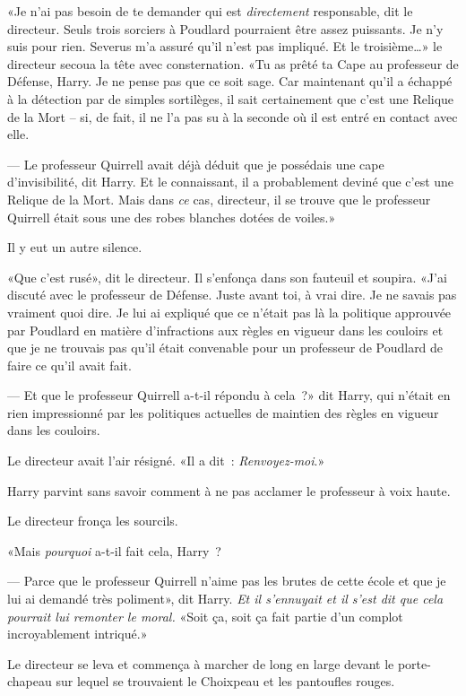 «Je n'ai pas besoin de te demander qui est \emph{directement} responsable, dit le directeur. Seuls trois sorciers à Poudlard pourraient être assez puissants. Je n'y suis pour rien. Severus m'a assuré qu'il n'est pas impliqué. Et le troisième…» le directeur secoua la tête avec consternation. «Tu as prêté ta Cape au professeur de Défense, Harry. Je ne pense pas que ce soit sage. Car maintenant qu'il a échappé à la détection par de simples sortilèges, il sait certainement que c'est une Relique de la Mort -- si, de fait, il ne l'a pas su à la seconde où il est entré en contact avec elle.

--- Le professeur Quirrell avait déjà déduit que je possédais une cape d'invisibilité, dit Harry. Et le connaissant, il a probablement deviné que c'est une Relique de la Mort. Mais dans \emph{ce} cas, directeur, il se trouve que le professeur Quirrell était sous une des robes blanches dotées de voiles.»

Il y eut un autre silence.

«Que c'est rusé», dit le directeur. Il s'enfonça dans son fauteuil et soupira. «J'ai discuté avec le professeur de Défense. Juste avant toi, à vrai dire. Je ne savais pas vraiment quoi dire. Je lui ai expliqué que ce n'était pas là la politique approuvée par Poudlard en matière d'infractions aux règles en vigueur dans les couloirs et que je ne trouvais pas qu'il était convenable pour un professeur de Poudlard de faire ce qu'il avait fait.

--- Et que le professeur Quirrell a-t-il répondu à cela~?» dit Harry, qui n'était en rien impressionné par les politiques actuelles de maintien des règles en vigueur dans les couloirs.

Le directeur avait l'air résigné. «Il a dit~: \emph{Renvoyez-moi}.»

Harry parvint sans savoir comment à ne pas acclamer le professeur à voix haute.

Le directeur fronça les sourcils.

«Mais \emph{pourquoi} a-t-il fait cela, Harry~?

--- Parce que le professeur Quirrell n'aime pas les brutes de cette école et que je lui ai demandé très poliment», dit Harry. \emph{Et il s'ennuyait et il s'est dit que cela pourrait lui remonter le moral.} «Soit ça, soit ça fait partie d'un complot incroyablement intriqué.»

Le directeur se leva et commença à marcher de long en large devant le porte-chapeau sur lequel se trouvaient le Choixpeau et les pantoufles rouges.

